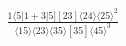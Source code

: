 \documentclass[varwidth, border=5pt]{standalone}
\begin{document}
\begin{my}
$\begin{gathered}
\scriptscriptstyle\frac{1⟨5|1+3|5][23]⟨24⟩⟨25⟩^2}{⟨15⟩⟨23⟩⟨35⟩[35]⟨45⟩^3}
\end{gathered}$
\end{my}
\end{document}
